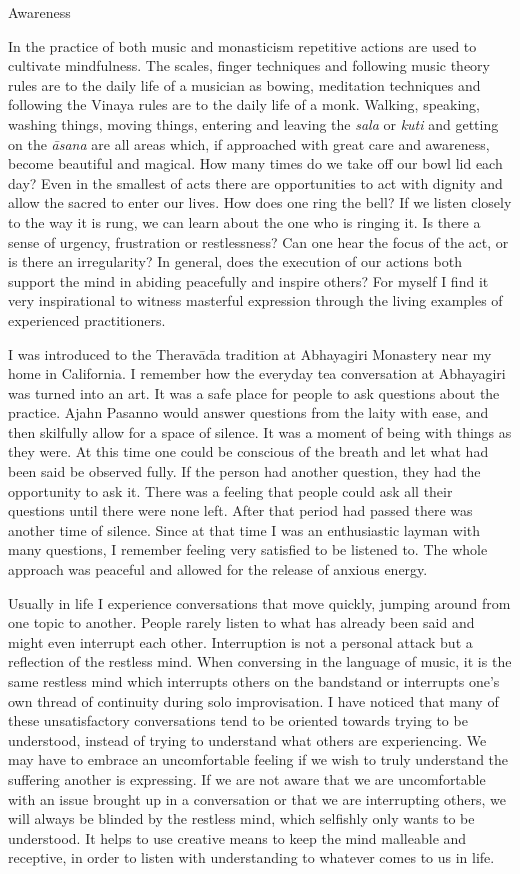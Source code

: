 Awareness

In the practice of both music and monasticism repetitive actions are
used to cultivate mindfulness. The scales, finger techniques and
following music theory rules are to the daily life of a musician as
bowing, meditation techniques and following the Vinaya rules are to the
daily life of a monk. Walking, speaking, washing things, moving things,
entering and leaving the \emph{sala} or \emph{kuti} and getting on the
\emph{āsana} are all areas which, if approached with great care and
awareness, become beautiful and magical. How many times do we take off
our bowl lid each day? Even in the smallest of acts there are
opportunities to act with dignity and allow the sacred to enter our
lives. How does one ring the bell? If we listen closely to the way it is
rung, we can learn about the one who is ringing it. Is there a sense of
urgency, frustration or restlessness? Can one hear the focus of the act,
or is there an irregularity? In general, does the execution of our
actions both support the mind in abiding peacefully and inspire others?
For myself I find it very inspirational to witness masterful expression
through the living examples of experienced practitioners.

I was introduced to the Theravāda tradition at Abhayagiri Monastery near
my home in California. I remember how the everyday tea conversation at
Abhayagiri was turned into an art. It was a safe place for people to ask
questions about the practice. Ajahn Pasanno would answer questions from
the laity with ease, and then skilfully allow for a space of silence. It
was a moment of being with things as they were. At this time one could
be conscious of the breath and let what had been said be observed fully.
If the person had another question, they had the opportunity to ask it.
There was a feeling that people could ask all their questions until
there were none left. After that period had passed there was another
time of silence. Since at that time I was an enthusiastic layman with
many questions, I remember feeling very satisfied to be listened to. The
whole approach was peaceful and allowed for the release of anxious
energy.

Usually in life I experience conversations that move quickly, jumping
around from one topic to another. People rarely listen to what has
already been said and might even interrupt each other. Interruption is
not a personal attack but a reflection of the restless mind. When
conversing in the language of music, it is the same restless mind which
interrupts others on the bandstand or interrupts one's own thread of
continuity during solo improvisation. I have noticed that many of these
unsatisfactory conversations tend to be oriented towards trying to be
understood, instead of trying to understand what others are
experiencing. We may have to embrace an uncomfortable feeling if we wish
to truly understand the suffering another is expressing. If we are not
aware that we are uncomfortable with an issue brought up in a
conversation or that we are interrupting others, we will always be
blinded by the restless mind, which selfishly only wants to be
understood. It helps to use creative means to keep the mind malleable
and receptive, in order to listen with understanding to whatever comes
to us in life.

